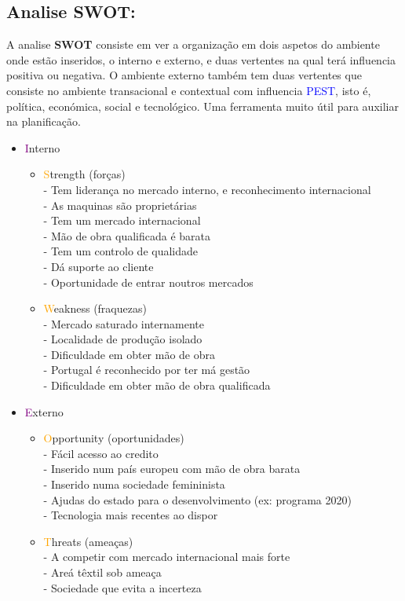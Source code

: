 \subsection{Analise SWOT:}
A analise \textbf{SWOT} consiste em ver a organização em dois aspetos do ambiente onde estão inseridos, o interno e externo, e duas vertentes na qual terá influencia positiva ou negativa. O ambiente externo também tem duas vertentes que consiste no ambiente transacional e contextual com influencia \textcolor{blue}{PEST}, isto é, política, económica, social e tecnológico. Uma ferramenta muito útil para auxiliar na planificação.
\begin{itemize}
\setlength\itemsep{-0.5em}
\item \textcolor{purple}{I}nterno
\begin{itemize}
\setlength\itemsep{-0.3em}
\item \textcolor{orange}{S}trength (forças)\\
- Tem liderança no mercado interno, e reconhecimento internacional\\
- As maquinas são proprietárias\\
- Tem um mercado internacional\\
- Mão de obra qualificada é barata\\
- Tem um controlo de qualidade\\
- Dá suporte ao cliente\\
- Oportunidade de entrar noutros mercados
\item \textcolor{orange}{W}eakness (fraquezas)\\
- Mercado saturado internamente\\
- Localidade de produção isolado\\
- Dificuldade em obter mão de obra\\
- Portugal é reconhecido por ter má gestão\\
- Dificuldade em obter mão de obra qualificada
\end{itemize}
\item \textcolor{purple}{E}xterno
\begin{itemize}
\setlength\itemsep{-0.3em}
\item \textcolor{orange}{O}pportunity (oportunidades)\\
- Fácil acesso ao credito\\
- Inserido num país europeu com mão de obra barata\\
- Inserido numa sociedade femininista\\
- Ajudas do estado para o desenvolvimento (ex: programa 2020)\\
- Tecnologia mais recentes ao dispor
\item \textcolor{orange}{T}hreats (ameaças)\\
- A competir com mercado internacional mais forte\\
- Areá têxtil sob ameaça\\
- Sociedade que evita a incerteza
\end{itemize}
\end{itemize}
